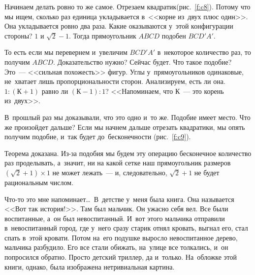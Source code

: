 
Начинаем делать ровно то же самое. Отрезаем квадратик\linebreak (рис.~\ref{f:c8}). Потому что мы ищем, сколько раз
единица укладывается в~<<корне из~двух плюс один>>. Она укладывается ровно два раза.
Какие оказываются у~этой конфигурации стороны? $1$ и $\sqrt2-1$.
Тогда прямоугольник
$ABCD$ подобен $BCD'A'$.



То есть если мы перевернем и~увеличим $BCD'A'$ в~некоторое количество раз, то получим $ABCD$.
Доказательство нужно? Сейчас будет. Что такое подобие? Это~--- <<сильная похожесть>> фигур. Углы у~прямоугольников одинаковые, не~хватает лишь пропорциональности сторон.
Анализируем, есть ли она.
$1:(\text{К}+1)$ равно ли $(\text{К}-1):1$? <<Напоминаем, что $\text{К}$~--- это корень из~двух>>.


В~прошлый раз мы доказывали, что это одно и~то же. Подобие имеет место. Что же произойдет дальше?
Если мы начнем дальше отрезать квадратики, мы опять получим подобие, и~так будет до~бесконечности
(рис.~\ref{f:c9}).


Теорема доказана. Из-за подобия мы будем эту операцию бесконечное количество раз проделывать,
а~значит, ни на какой сетке наш прямоугольник размеров $(\sqrt2+1)\times 1$ не может лежать~--- и, следовательно, $\sqrt2+1$ не
будет рациональным числом.

Что-то это мне напоминает\ldots\ В~детстве у~меня была книга. Она называется <<Вот так история!>>. Там
был мальчик. Он ужасно себя вел. Все были воспитанные, а~он был невоспитанный. И~вот этого мальчика
отправили в~невоспитанный город, где у~него сразу старик отнял кровать, выгнал его, стал спать
в~этой кровати. Потом на~его подушке выросло невоспитанное дерево, мальчика разбудило. Его
все стали обижать, на~улице все толкались, и~он попросился обратно. Просто детский триллер, да
и~только. На~обложке этой книги, однако, была изображена нетривиальная картина.


